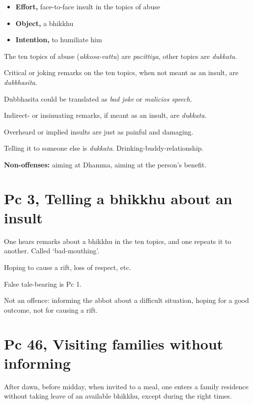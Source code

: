\begin{multicols}{2}

\begin{itemize}
\tightlist
\item
  \textbf{Effort,} face-to-face insult in the topics of abuse
\item
  \textbf{Object,} a bhikkhu
\item
  \textbf{Intention,} to humiliate him
\end{itemize}

The ten topics of abuse (\emph{akkosa-vattu}) are \emph{pacittiya},
other topics are \emph{dukkata}.

Critical or joking remarks on the ten topics, when not meant as an
insult, are \emph{dubbhasita}.

Dubbhasita could be translated as \emph{bad joke} or \emph{malicios
speech}.

Indirect- or insinuating remarks, if meant as an insult, are
\emph{dukkata}.

Overheard or implied insults are just as painful and damaging.

Telling it to someone else is \emph{dukkata}.
Drinking-buddy-relationship.

\textbf{Non-offenses:} aiming at Dhamma, aiming at the person's benefit.

\end{multicols}

\section{Pc 3, Telling a bhikkhu about an insult}

One hears remarks about a bhikkhu in the ten topics, and one repeats it
to another. Called `bad-mouthing'.

Hoping to cause a rift, loss of respect, etc.

False tale-bearing is Pc 1.

Not an offence: informing the abbot about a difficult situation, hoping
for a good outcome, not for causing a rift.

\section{Pc 46, Visiting families without informing}

After dawn, before midday, when invited to a meal, one enters a family
residence without taking leave of an available bhikkhu, except during
the right times.


